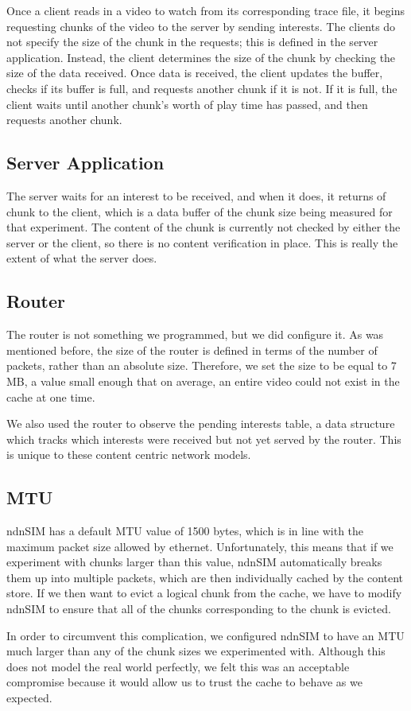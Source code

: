 Once a client reads in a video to watch from its corresponding trace file, it
begins requesting chunks of the video to the server by sending interests. The
clients do not specify the size of the chunk in the requests; this is defined in
the server application. Instead, the client determines the size of the chunk by
checking the size of the data received. Once data is received, the client
updates the buffer, checks if its buffer is full, and requests another chunk if
it is not. If it is full, the client waits until another chunk’s worth of play
time has passed, and then requests another chunk.

\subsection{Server Application} \label{sec:server}

The server waits for an interest to be received, and when it does, it returns of
chunk to the client, which is a data buffer of the chunk size being measured for
that experiment. The content of the chunk is currently not checked by either the
server or the client, so there is no content verification in place. This is
really the extent of what the server does.

\subsection{Router} \label{sec:router}

The router is not something we programmed, but we did configure it. As was
mentioned before, the size of the router is defined in terms of the number of
packets, rather than an absolute size. Therefore, we set the size to be equal to
7 MB, a value small enough that on average, an entire video could not exist in
the cache at one time.

We also used the router to observe the pending interests table, a data structure
which tracks which interests were received but not yet served by the router.
This is unique to these content centric network models.

\subsection{MTU} \label{sec:mtu}

ndnSIM has a default MTU value of 1500 bytes, which is in line with the maximum
packet size allowed by ethernet. Unfortunately, this means that if we experiment
with chunks larger than this value, ndnSIM automatically breaks them up into
multiple packets, which are then individually cached by the content store. If we
then want to evict a logical chunk from the cache, we have to modify ndnSIM to
ensure that all of the chunks corresponding to the chunk is evicted. 

In order to circumvent this complication, we configured ndnSIM to have an MTU
much larger than any of the chunk sizes we experimented with. Although this does
not model the real world perfectly, we felt this was an acceptable compromise
because it would allow us to trust the cache to behave as we expected.

